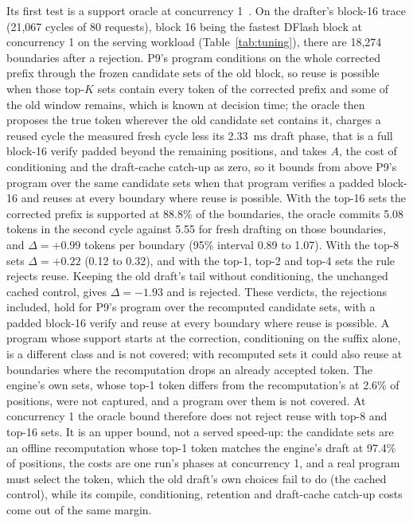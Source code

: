 Its first test is a support oracle at concurrency 1~. On the drafter's block-16 trace (21,067 cycles of 80 requests), block 16 being the fastest DFlash block at concurrency 1 on the serving workload (Table~\ref{tab:tuning}), there are 18,274 boundaries after a rejection. P9's program conditions on the whole corrected prefix through the frozen candidate sets of the old block, so reuse is possible when those top-$K$ sets contain every token of the corrected prefix and some of the old window remains, which is known at decision time; the oracle then proposes the true token wherever the old candidate set contains it, charges a reused cycle the measured fresh cycle less its 2.33~ms draft phase, that is a full block-16 verify padded beyond the remaining positions, and takes $A$, the cost of conditioning and the draft-cache catch-up as zero, so it bounds from above P9's program over the same candidate sets when that program verifies a padded block-16 and reuses at every boundary where reuse is possible. With the top-16 sets the corrected prefix is supported at 88.8\% of the boundaries, the oracle commits 5.08 tokens in the second cycle against 5.55 for fresh drafting on those boundaries, and $\Delta=+0.99$ tokens per boundary (95\% interval 0.89 to 1.07). With the top-8 sets $\Delta=+0.22$ (0.12 to 0.32), and with the top-1, top-2 and top-4 sets the rule rejects reuse. Keeping the old draft's tail without conditioning, the unchanged cached control, gives $\Delta=-1.93$ and is rejected. These verdicts, the rejections included, hold for P9's program over the recomputed candidate sets, with a padded block-16 verify and reuse at every boundary where reuse is possible. A program whose support starts at the correction, conditioning on the suffix alone, is a different class and is not covered; with recomputed sets it could also reuse at boundaries where the recomputation drops an already accepted token. The engine's own sets, whose top-1 token differs from the recomputation's at 2.6\% of positions, were not captured, and a program over them is not covered. At concurrency 1 the oracle bound therefore does not reject reuse with top-8 and top-16 sets. It is an upper bound, not a served speed-up: the candidate sets are an offline recomputation whose top-1 token matches the engine's draft at 97.4\% of positions, the costs are one run's phases at concurrency 1, and a real program must select the token, which the old draft's own choices fail to do (the cached control), while its compile, conditioning, retention and draft-cache catch-up costs come out of the same margin.

